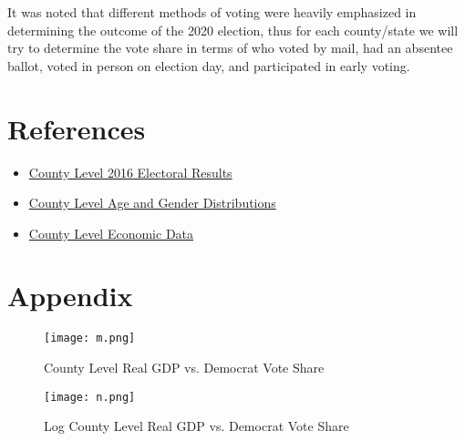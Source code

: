 \documentclass[letterpaper, twocolumn]{article}
\begin{document}
It was noted that different methods of voting were heavily emphasized in determining the outcome of the 2020 election, thus for each county/state we will try to determine the vote share in terms of who voted by mail, had an absentee ballot, voted in person on election day, and participated in early voting.

\section{References}

\begin{itemize}
  \item \href{https://public.opendatasoft.com/explore/dataset/usa-2016-presidential-election-by-county/table/?disjunctive.stat}{County Level 2016 Electoral Results}
  \item \href{https://www.census.gov/data/tables/time-series/demo/popest/2010s-counties-detail.html}{County Level Age and Gender Distributions}
  \item \href{https://apps.bea.gov/iTable/index_regional.cfm}{County Level Economic Data}  
  
\end{itemize}



\pagebreak

\section{Appendix}

\begin{figure}[htbp]
    \centering
    \texttt{[image: m.png]}
    \caption{County Level Real GDP vs. Democrat Vote Share}
    \label{fig:arstmade}
\end{figure}

\begin{figure}[htbp]
    \centering
    \texttt{[image: n.png]}
    \caption{Log County Level Real GDP vs. Democrat Vote Share}
    \label{fig:arstmade}
\end{figure}
\end{document}
